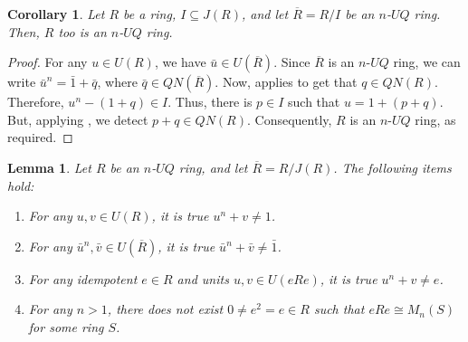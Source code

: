 \documentclass[12pt]{amsart}
\newtheorem{lemma}[theorem]{Lemma}
\newtheorem{corollary}[theorem]{Corollary}
\theoremstyle{definition}
\begin{document}
\begin{corollary}\label{factor UQ}
Let $R$ be a ring, $I \subseteq J(R)$, and let $\overline{R} = R/I$ be an $n$-$UQ$ ring. Then, $R$ too is an $n$-$UQ$ ring.
\end{corollary}

\begin{proof}
For any $u \in U(R)$, we have $\bar{u} \in U(\overline{R})$. Since $\overline{R}$ is an $n$-$UQ$ ring, we can write ${\bar{u}}^n = \bar{1} + \bar{q}$, where $\bar{q} \in QN(\overline{R})$. Now, \cite[Lemma 4.1(1)]{daoa} applies to get that $q \in QN(R)$. Therefore, $u^n - (1 + q) \in I$. Thus, there is $p \in I$ such that $u = 1 + (p + q)$. But, applying \cite[Lemma 4.1(2)]{daoa}, we detect $p + q \in QN(R)$. Consequently, $R$ is an $n$-$UQ$ ring, as required.
\end{proof}

\begin{lemma}\label{sum two unit}
Let $R$ be an $n$-$UQ$ ring, and let $\overline{R} = R/J(R)$. The following items hold:
\begin{enumerate}
\item	
For any $u, v \in U(R)$, it is true $u^n + v \neq 1$.
\item	
For any $\bar{u}^n, \bar{v} \in U(\overline{R})$, it is true $\bar{u}^n + \bar{v} \neq \bar{1}$.
\item
For any idempotent $e \in R$ and units $u,v \in U(eRe)$, it is true $u^n + v \neq e$.
\item	
For any $n>1$, there does not exist $0 \neq e^2=e \in R$ such that $eRe \cong M_n(S)$ for some ring $S$.
\end{enumerate}
\end{lemma}
\end{document}
